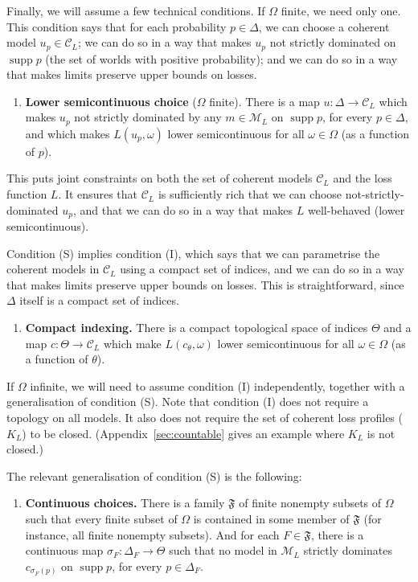\documentclass[11pt]{article}
\theoremstyle{definition}
\theoremstyle{remark}
\newcommand{\M}{\mathcal M}
\newcommand{\C}{\mathcal C}
\newcommand{\F}{\mathfrak F}
\newcommand{\supp}{\operatorname{supp}}
\begin{document}
Finally, we will assume a few technical conditions. If $\Omega$ finite, we need only one. This condition says that for each probability $p\in\Delta$, we can choose a coherent model $u_p\in\C_L$; we can do so in a way that makes $u_p$ not strictly dominated on $\supp p$ (the set of worlds with positive probability); and we can do so in a way that makes limits preserve upper bounds on losses.
\begin{enumerate}[label=\textbf{(S)},leftmargin=*]
\item \textbf{Lower semicontinuous choice} ($\Omega$ finite). There is a map $u:\Delta\to\C_L$ which makes $u_p$ not strictly dominated by any $m\in\M_L$ on $\supp p$, for every $p\in\Delta$, and which makes $L(u_p,\omega)$ lower semicontinuous for all $\omega\in\Omega$ (as a function of $p$).
\end{enumerate}
This puts joint constraints on both the set of coherent models $\C_L$ and the loss function $L$. It ensures that $\C_L$ is sufficiently rich that we can choose not-strictly-dominated $u_p$, and that we can do so in a way that makes $L$ well-behaved (lower semicontinuous).


Condition (S) implies condition (I), which says that we can parametrise the coherent models in $\C_L$ using a compact set of indices, and we can do so in a way that makes limits preserve upper bounds on losses. This is straightforward, since $\Delta$ itself is a compact set of indices.
\begin{enumerate}[label=\textbf{(I)},leftmargin=*]
\item \textbf{Compact indexing.} There is a compact topological space of indices $\Theta$ and a map $c:\Theta\to\C_L$ which make $L(c_\theta,\omega)$ lower semicontinuous for all $\omega\in\Omega$ (as a function of $\theta$).
\end{enumerate}
If $\Omega$ infinite, we will need to assume condition (I) independently, together with a generalisation of condition (S). Note that condition (I) does not require a topology on all models. It also does not require the set of coherent loss profiles ($K_L$) to be closed. (Appendix~\ref{sec:countable} gives an example where $K_L$ is not closed.) 


The relevant generalisation of condition (S) is the following:
\begin{enumerate}[label=\textbf{(S$_\infty$)},leftmargin=*]
\item \textbf{Continuous choices.} There is a family $\F$ of finite nonempty subsets of $\Omega$ such that every finite subset of $\Omega$ is contained in some member of $\F$ (for instance, all finite nonempty subsets). And for each $F\in\F$, there is a continuous map $\sigma_F:\Delta_F\to\Theta$ such that no model in $\M_L$ strictly dominates $c_{\sigma_F(p)}$ on $\supp p$, for every $p\in\Delta_F$.
\end{enumerate}
\end{document}
